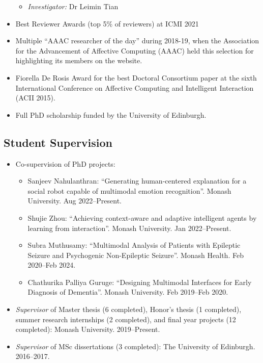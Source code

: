 \documentclass[11pt,letterpaper]{article}
\begin{document}
\begin{itemize}
\begin{itemize}
    \item \emph{Investigator:} Dr Leimin Tian
  \end{itemize}
  \item Best Reviewer Awards (top 5\% of reviewers) at ICMI 2021
  \item Multiple ``AAAC researcher of the day'' during 2018-19, when the Association for the Advancement of Affective Computing (AAAC) held this selection for highlighting its members on the website.
  \item Fiorella De Rosis Award for the best Doctoral Consortium paper at the sixth International Conference on Affective Computing and Intelligent Interaction (ACII 2015).
  \item Full PhD scholarship funded by the University of Edinburgh.
\end{itemize}

\subsection*{Student Supervision}
\begin{itemize}
  \item Co-supervision of PhD projects:
  \begin{itemize}
    \item Sanjeev Nahulanthran: ``Generating human-centered explanation for a social robot capable of multimodal emotion recognition''. Monash University. Aug 2022--Present.
    \item Shujie Zhou: ``Achieving context-aware and adaptive intelligent agents by learning from interaction''. Monash University. Jan 2022--Present.
    \item Subra Muthusamy: ``Multimodal Analysis of Patients with Epileptic Seizure and Psychogenic Non-Epileptic Seizure''. Monash Health. Feb 2020--Feb 2024.
    \item Chathurika Palliya Guruge: ``Designing Multimodal Interfaces for Early Diagnosis of Dementia''. Monash University. Feb 2019--Feb 2020.
  \end{itemize}
  \item \emph{Supervisor} of Master thesis (6 completed), Honor's thesis (1 completed), summer research internships (2 completed), and final year projects (12 completed): Monash University. 2019--Present.
  \item \emph{Supervisor} of MSc dissertations (3 completed): The University of Edinburgh. 2016--2017.
\end{itemize}
\end{document}
